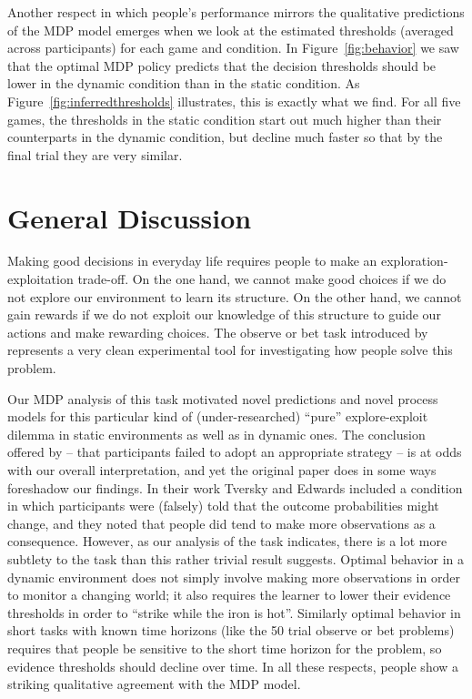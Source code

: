 \documentclass[authoryear]{elsarticle}
\newcommand{\sectionX}[1]{\section{#1}}
\begin{document}
Another respect in which people's performance mirrors the qualitative predictions of the MDP model emerges when we look at the estimated thresholds (averaged across participants) for each game and condition. In Figure~\ref{fig:behavior} we saw that the optimal MDP policy predicts that the decision thresholds should be lower in the dynamic condition than in the static condition. As Figure~\ref{fig:inferredthresholds} illustrates, this is exactly what we find. For all five games, the thresholds in the static condition start out much higher than their counterparts in the dynamic condition, but decline much faster so that by the final trial they are very similar.


\sectionX{General Discussion}

Making good decisions in everyday life requires people to make an exploration-exploitation trade-off. On the one hand, we cannot make good choices if we do not explore our environment  to learn its structure. On the other hand, we cannot gain rewards if we do not exploit our knowledge of this structure to guide our actions and make rewarding choices. The observe or bet task introduced by \citet{tversky_information_1966} represents a very clean experimental tool for investigating how people solve this problem.

Our MDP analysis of this task motivated novel predictions and novel process models for this particular kind of (under-researched) ``pure'' explore-exploit dilemma in static environments as well as in dynamic ones. The conclusion offered by \citet{tversky_information_1966} -- that participants failed to adopt an appropriate strategy -- is at odds with our overall interpretation, and yet the original paper does in some ways foreshadow our findings. In their work Tversky and Edwards included a condition in which participants were (falsely) told that the outcome probabilities might change, and they noted that people did tend to make more observations as a consequence.  However, as our analysis of the task indicates, there is a lot more subtlety to the task than this rather trivial  result suggests. Optimal behavior in a dynamic environment does not simply involve making more observations in order to monitor a changing world; it also requires the learner to lower their evidence thresholds in order to ``strike while the iron is hot''.  Similarly optimal behavior in short tasks with known time horizons (like the 50 trial observe or bet problems) requires that people be sensitive to the short time horizon for the problem, so evidence thresholds should decline over time. In all these respects, people show a striking qualitative agreement with the MDP model.
\end{document}
